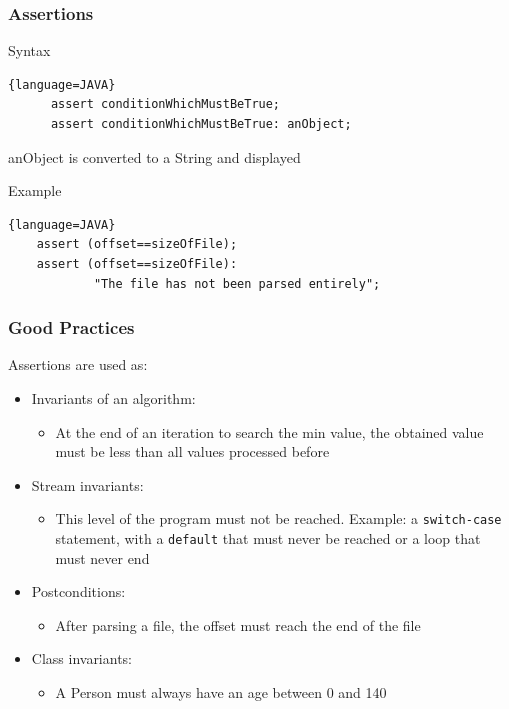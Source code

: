 \documentclass{beamer}
\begin{document}
\begin{frame}[fragile]
  \frametitle{Assertions}
  \begin{block}{Syntax}
    \begin{lstlisting}{language=JAVA}
      assert conditionWhichMustBeTrue;
      assert conditionWhichMustBeTrue: anObject;
    \end{lstlisting}
    anObject is converted to a String and displayed
  \end{block}
  \begin{block}{Example}
    \begin{lstlisting}{language=JAVA}    
    assert (offset==sizeOfFile);
    assert (offset==sizeOfFile):
            "The file has not been parsed entirely";
    \end{lstlisting}
  \end{block}  
\end{frame}

\begin{frame}
  \frametitle{Good Practices}
  Assertions are used as:
  \begin{itemize}
  \item Invariants of an algorithm:
    \begin{itemize}
    \item At the end of an iteration to search the min value, the
      obtained value must be less than all values processed before
    \end{itemize}
  \item Stream invariants:
    \begin{itemize}
    \item This level of the program must not be reached. Example: a
      \texttt{switch-case} statement, with a \texttt{default} that
      must never be reached or a loop that must never end
    \end{itemize}
  \item Postconditions:
    \begin{itemize}
    \item After parsing a file, the offset must reach the end of
      the file
    \end{itemize}    
  \item Class invariants:
    \begin{itemize}
    \item A Person must always have an age between 0 and 140
    \end{itemize}        
  \end{itemize}
\end{frame}
\end{document}
